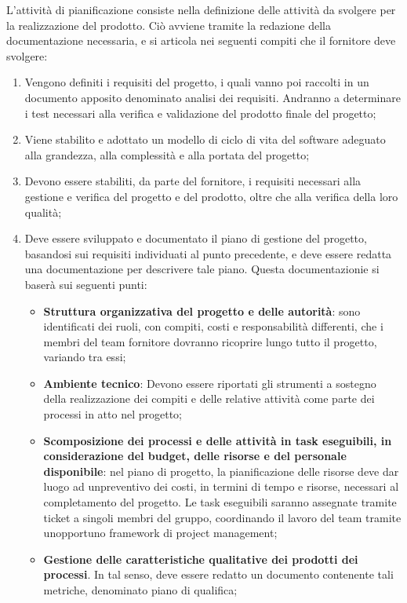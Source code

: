 L'attività di pianificazione consiste nella definizione delle attività da svolgere per la realizzazione del prodotto. Ciò avviene tramite la redazione della documentazione necessaria, e si articola nei seguenti compiti che il fornitore deve svolgere:
\begin{enumerate}
    \item Vengono definiti i requisiti del progetto, i quali vanno poi raccolti in un documento apposito denominato analisi dei requisiti. Andranno a determinare i test necessari alla verifica e validazione del prodotto finale del progetto;
    \item Viene stabilito e adottato un modello di ciclo di vita del software adeguato alla grandezza, alla complessità e alla portata del progetto;
    \item Devono essere stabiliti, da parte del fornitore, i requisiti necessari alla gestione e verifica del progetto e del prodotto, oltre che alla verifica della loro qualità;
    \item Deve essere sviluppato e documentato il piano di gestione del progetto, basandosi sui requisiti individuati al punto precedente, e deve essere redatta una documentazione per descrivere tale piano. Questa documentazionie si baserà sui seguenti punti:
    \begin{itemize}
        \item \textbf{Struttura organizzativa del progetto e delle autorità}: sono identificati dei ruoli, con compiti, costi e responsabilità differenti, che i membri del team fornitore dovranno ricoprire lungo tutto il progetto, variando tra essi;
        \item \textbf{Ambiente tecnico}: Devono essere riportati gli strumenti a sostegno della realizzazione dei compiti e delle relative attività come parte dei processi in atto nel progetto;
        \item \textbf{Scomposizione dei processi e delle attività in task eseguibili, in considerazione del budget, delle risorse e del personale disponibile}: nel piano di progetto, la pianificazione delle risorse deve dar luogo ad unpreventivo dei costi, in termini di tempo e risorse, necessari al completamento del progetto. Le task eseguibili saranno assegnate tramite ticket a singoli membri del gruppo, coordinando il lavoro del team tramite unopportuno framework di project management;
        \item \textbf{Gestione delle caratteristiche qualitative dei prodotti dei processi}. In tal senso, deve essere redatto un documento contenente tali metriche, denominato piano di qualifica;

\end{itemize}
\end{enumerate}

